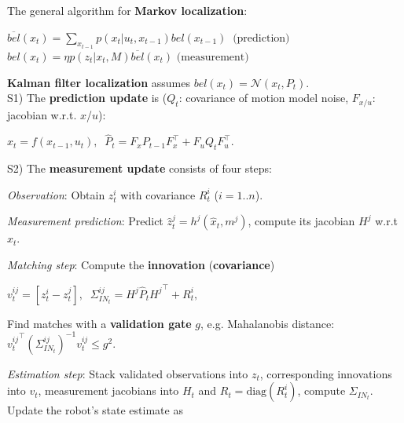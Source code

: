 \documentclass[landscape]{article}
\newcommand{\vmspace}{\vspace{-7pt}}
\newcommand{\vamspace}{\vspace{-3pt}}
\newcommand{\vpspace}{\vspace{5pt}}
\begin{document}
\begin{multicols}{3}
\vpspace

\begin{minipage}{\columnwidth}
  The general algorithm for \textbf{Markov localization}:

  \vamspace

  \begin{algorithm}[H]
    \DontPrintSemicolon
    {
    $
    \overline{bel}(x_t)
    =
    \sum_{x_{t-1}} p(x_t|u_t, x_{t-1}) bel(x_{t-1})
    \;\;
    \text{(prediction)}
    $\;
    $
    bel(x_t)
    =
    \eta p(z_t|x_t, M) \overline{bel}(x_t)
    $
    \hspace{29pt}
    $
    \text{(measurement)}
    $\;
    }
  \end{algorithm}
\end{minipage}

\vpspace


\begin{minipage}{\columnwidth}
  \textbf{Kalman filter localization} assumes
  $bel(x_t) = \mathcal N (x_t, P_t).  $\\
  S1) The \textbf{prediction update} is ($Q_t$: covariance of motion model
  noise, $F_{x/u}$: jacobian w.r.t. $x$/$u$):
  \vmspace
  \begin{center}
    $
    \hat x_t = f(x_{t-1}, u_t),\;\;
    \hat P_t = F_x P_{t-1} F_x^\intercal + F_u Q_t F_u^\intercal.
    $
  \end{center}
  \vmspace
  S2) The \textbf{measurement update} consists of four steps:
  \begin{compactenum}
  \item \textit{Observation}: Obtain $z_t^i$ with
    covariance $R_t^i$ ($i=1..n$).
  \item \textit{Measurement prediction}: Predict $\hat z_t^j = h^j(\hat x_t, m^j)$,
    compute its jacobian $H^j$ w.r.t $\hat x_t$.
  \item \textit{Matching step}: Compute the \textbf{innovation}
    (\textbf{covariance})

    \begin{center}
      $
      v_t^{ij}=[z_t^i - z_t^j],\;\;
      \Sigma_{IN_t}^{ij} = H^j \hat P_t {H^j}^\intercal + R_t^i,
      $
    \end{center}

    Find matches with a \textbf{validation gate} $g$, e.g. Mahalanobis distance:
    ${v_t^{ij}}^\intercal (\Sigma_{IN_t}^{ij})^{-1} v_t^{ij} \le g^2$.

  \item \textit{Estimation step}: Stack validated observations into $z_t$, corresponding
    innovations into $v_t$, measurement jacobians into $H_t$ and
    $R_t = \mathrm{diag}(R_t^i)$, compute $\Sigma_{IN_t}$. Update the robot's
    state estimate as


\end{compactenum}
\end{minipage}
\end{multicols}
\end{document}
